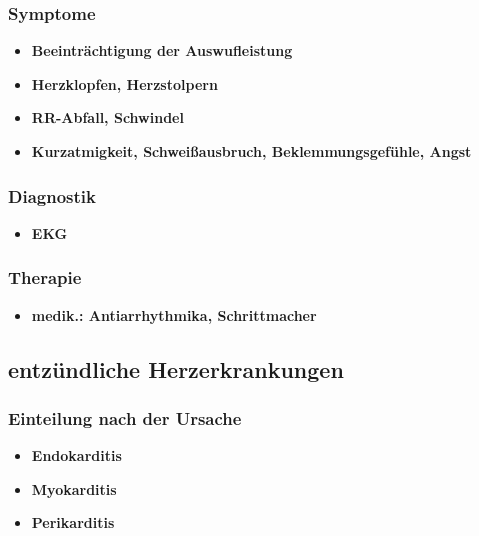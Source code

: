 		\subsubsection{Symptome}
			\begin{itemize}
				\item \textbf{Beeinträchtigung der Auswufleistung}
				\item \textbf{Herzklopfen, Herzstolpern}
				\item \textbf{RR-Abfall, Schwindel}
				\item \textbf{Kurzatmigkeit, Schweißausbruch, Beklemmungsgefühle, Angst}
			\end{itemize}
		\subsubsection{Diagnostik}
			\begin{itemize}
				\item \textbf{EKG}
			\end{itemize}
		\subsubsection{Therapie}
			\begin{itemize}
				\item \textbf{medik.: Antiarrhythmika, Schrittmacher}
			\end{itemize}
	\subsection{entzündliche Herzerkrankungen}
		\subsubsection{Einteilung nach der Ursache}
			\begin{itemize}
				\item \textbf{Endokarditis}
				\item \textbf{Myokarditis}
				\item \textbf{Perikarditis}
			\end{itemize}
